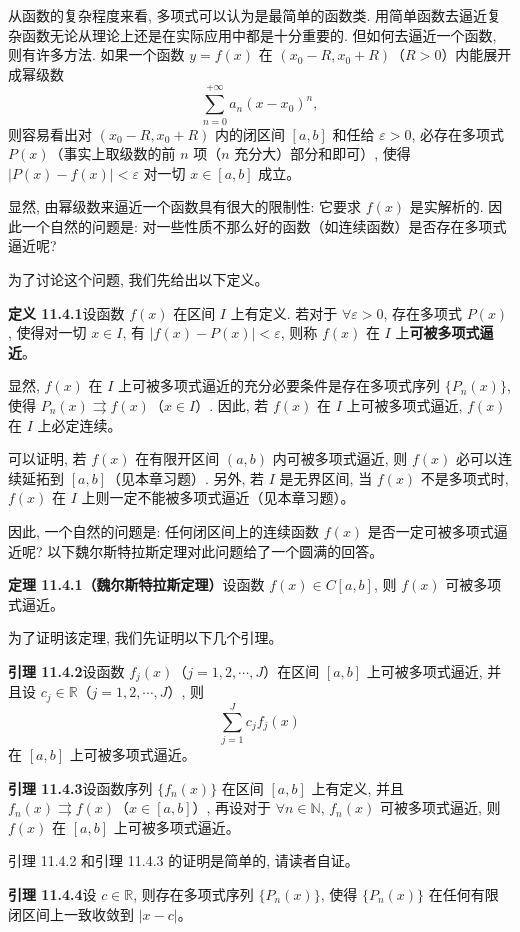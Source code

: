 \documentclass[UTF8, 12pt, fontset=fandol, oneside]{ctexart}
\begin{document}
从函数的复杂程度来看, 多项式可以认为是最简单的函数类. 用简单函数去逼近复杂函数无论从理论上还是在实际应用中都是十分重要的. 但如何去逼近一个函数, 则有许多方法. 如果一个函数 $y=f(x)$ 在 $(x_0-R,x_0+R)$（$R>0$）内能展开成幂级数
\[
  \sum_{n=0}^{+\infty}a_n(x-x_0)^n,
\]
则容易看出对 $(x_0-R,x_0+R)$ 内的闭区间 $[a,b]$ 和任给 $\varepsilon>0$, 必存在多项式 $P(x)$（事实上取级数的前 $n$ 项（$n$ 充分大）部分和即可）, 使得 $|P(x)-f(x)|<\varepsilon$ 对一切 $x\in[a,b]$ 成立。

显然, 由幂级数来逼近一个函数具有很大的限制性: 它要求 $f(x)$ 是实解析的. 因此一个自然的问题是: 对一些性质不那么好的函数（如连续函数）是否存在多项式逼近呢?

为了讨论这个问题, 我们先给出以下定义。

\noindent\textbf{定义 11.4.1}\quad 设函数 $f(x)$ 在区间 $I$ 上有定义. 若对于 $\forall\varepsilon>0$, 存在多项式 $P(x)$, 使得对一切 $x\in I$, 有 $|f(x)-P(x)|<\varepsilon$, 则称 $f(x)$ 在 $I$ 上\textbf{可被多项式逼近}。

显然, $f(x)$ 在 $I$ 上可被多项式逼近的充分必要条件是存在多项式序列 $\{P_n(x)\}$, 使得 $P_n(x)\rightrightarrows f(x)$（$x\in I$）. 因此, 若 $f(x)$ 在 $I$ 上可被多项式逼近, $f(x)$ 在 $I$ 上必定连续。

可以证明, 若 $f(x)$ 在有限开区间 $(a,b)$ 内可被多项式逼近, 则 $f(x)$ 必可以连续延拓到 $[a,b]$（见本章习题）. 另外, 若 $I$ 是无界区间, 当 $f(x)$ 不是多项式时, $f(x)$ 在 $I$ 上则一定不能被多项式逼近（见本章习题）。

因此, 一个自然的问题是: 任何闭区间上的连续函数 $f(x)$ 是否一定可被多项式逼近呢? 以下魏尔斯特拉斯定理对此问题给了一个圆满的回答。

\noindent\textbf{定理 11.4.1（魏尔斯特拉斯定理）}\quad 设函数 $f(x)\in C[a,b]$, 则 $f(x)$ 可被多项式逼近。

为了证明该定理, 我们先证明以下几个引理。

\noindent\textbf{引理 11.4.2}\quad 设函数 $f_j(x)$（$j=1,2,\cdots,J$）在区间 $[a,b]$ 上可被多项式逼近, 并且设 $c_j\in\mathbb R$（$j=1,2,\cdots,J$）, 则
\[
  \sum_{j=1}^{J}c_jf_j(x)
\]
在 $[a,b]$ 上可被多项式逼近。

\noindent\textbf{引理 11.4.3}\quad 设函数序列 $\{f_n(x)\}$ 在区间 $[a,b]$ 上有定义, 并且 $f_n(x)\rightrightarrows f(x)$（$x\in[a,b]$）, 再设对于 $\forall n\in\mathbb N$, $f_n(x)$ 可被多项式逼近, 则 $f(x)$ 在 $[a,b]$ 上可被多项式逼近。

引理 11.4.2 和引理 11.4.3 的证明是简单的, 请读者自证。

\noindent\textbf{引理 11.4.4}\quad 设 $c\in\mathbb R$, 则存在多项式序列 $\{P_n(x)\}$, 使得 $\{P_n(x)\}$ 在任何有限闭区间上一致收敛到 $|x-c|$。
\end{document}
